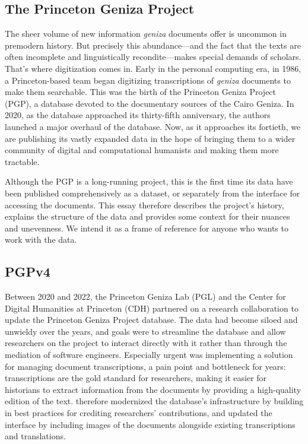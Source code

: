 \documentclass{article}
\begin{document}
\subsection{The Princeton Geniza Project}

The sheer volume of new information \textit{geniza} documents offer is uncommon in premodern history. But precisely this abundance—and the fact that the texts are often incomplete and linguistically recondite—makes special demands of scholars. That’s where digitization comes in. 
Early in the personal computing era, in 1986, a Princeton-based team began digitizing transcriptions of \textit{geniza} documents to make them searchable. This was the birth of the Princeton Geniza Project (PGP), a database devoted to the documentary sources of the Cairo Geniza. In 2020, as the database approached its thirty-fifth anniversary, the authors launched a major overhaul of the database. Now, as it approaches its fortieth, we are publishing its vastly expanded data in the hope of bringing them to a wider community of digital and computational humanists and making them more tractable.

Although the PGP is a long-running project, this is the first time its data have been published comprehensively as a dataset, or separately from the interface for accessing the documents. This essay therefore describes the project’s history, explains the structure of the data and provides some context for their nuances and unevenness. We intend it as a frame of reference for anyone who wants to work with the data. 

\subsection{PGPv4}

Between 2020 and 2022, the Princeton Geniza Lab (PGL) and the Center for Digital Humanities at Princeton (CDH) partnered on a research collaboration to update the Princeton Geniza Project database. The data had become siloed and unwieldy over the years, and  goals were to streamline the database and allow researchers on the project to interact directly with it rather than through the mediation of software engineers. Especially urgent was implementing a solution for managing document transcriptions, a pain point and bottleneck for years: transcriptions are the gold standard for researchers, making it easier for historians to extract information from the documents by providing a high-quality edition of the text.  therefore modernized the database’s infrastructure by building in best practices for crediting researchers’ contributions, and updated the interface by including images of the documents alongside existing transcriptions and translations. 
\end{document}
